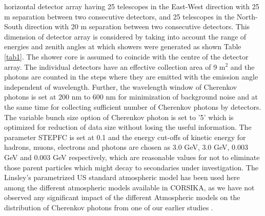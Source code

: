 \documentclass[amsmath,amssymb,showpacs,showkeywords]{revtex4}
\begin{document}
horizontal detector array having 25 telescopes in the East-West direction with 
25 m separation between two consecutive detectors, and 25 telescopes in the 
North-South direction with 20 m separation between two consecutive detectors. 
This dimension of detector array is considered by taking into account the range
of energies and zenith angles at which showers were generated as shown Table 
\ref{tab1}. The shower core is assumed to coincide with the centre of the 
detector array. The individual detectors have an effective collection area of 
9 m$^{2}$ and the photons are counted in the steps where they are emitted with 
the emission angle independent of wavelength. Further, the wavelength window 
of Cherenkov photons is set at 200 nm to 600 nm for minimization of background 
noise and at the same time for collecting sufficient number of Cherenkov 
photons by detectors. The variable bunch size option of Cherenkov photon is set to '5' which is optimized for reduction of data size without losing the useful 
information. The parameter STEPFC is set at 0.1 and the energy cut-offs of 
kinetic energy for hadrons, muons, electrons and photons are chosen as 3.0 GeV,
3.0 GeV, 0.003 GeV and 0.003 GeV respectively, which are reasonable values for 
not to eliminate those parent particles which might decay to secondaries under 
investigation. The Linsley's parametrized US standard atmospheric model 
\citep{US} has been used here among the different atmospheric models available 
in CORSIKA, as we have not observed any significant impact of the different 
Atmospheric models on the distribution of Cherenkov photons from one of our 
earlier studies \cite{Das}.
\end{document}
